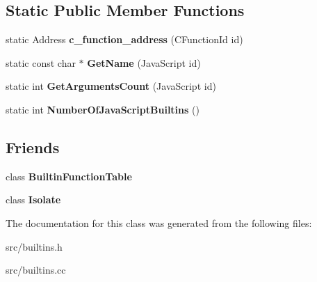\subsection*{Static Public Member Functions}
\begin{DoxyCompactItemize}
\item 
\hypertarget{classv8_1_1internal_1_1_builtins_a025a6664443f93abe1cb67d45d2845f8}{}static Address {\bfseries c\+\_\+function\+\_\+address} (C\+Function\+Id id)\label{classv8_1_1internal_1_1_builtins_a025a6664443f93abe1cb67d45d2845f8}

\item 
\hypertarget{classv8_1_1internal_1_1_builtins_ae238a93c60137e19bbe4989d18258de8}{}static const char $\ast$ {\bfseries Get\+Name} (Java\+Script id)\label{classv8_1_1internal_1_1_builtins_ae238a93c60137e19bbe4989d18258de8}

\item 
\hypertarget{classv8_1_1internal_1_1_builtins_afb983983c64c15a2ab0b5e1abbfdbff7}{}static int {\bfseries Get\+Arguments\+Count} (Java\+Script id)\label{classv8_1_1internal_1_1_builtins_afb983983c64c15a2ab0b5e1abbfdbff7}

\item 
\hypertarget{classv8_1_1internal_1_1_builtins_a2a062555a2f09307ae8b73bec2964b6c}{}static int {\bfseries Number\+Of\+Java\+Script\+Builtins} ()\label{classv8_1_1internal_1_1_builtins_a2a062555a2f09307ae8b73bec2964b6c}

\end{DoxyCompactItemize}
\subsection*{Friends}
\begin{DoxyCompactItemize}
\item 
\hypertarget{classv8_1_1internal_1_1_builtins_a6bf55384c2c77dfdeecf52210335713e}{}class {\bfseries Builtin\+Function\+Table}\label{classv8_1_1internal_1_1_builtins_a6bf55384c2c77dfdeecf52210335713e}

\item 
\hypertarget{classv8_1_1internal_1_1_builtins_aba4f0964bdacf2bbf62cf876e5d28d0a}{}class {\bfseries Isolate}\label{classv8_1_1internal_1_1_builtins_aba4f0964bdacf2bbf62cf876e5d28d0a}

\end{DoxyCompactItemize}


The documentation for this class was generated from the following files\+:\begin{DoxyCompactItemize}
\item 
src/builtins.\+h\item 
src/builtins.\+cc\end{DoxyCompactItemize}
